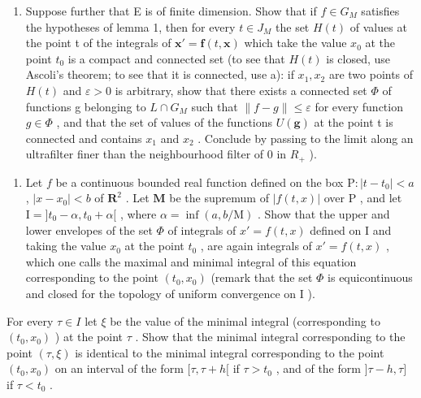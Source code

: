 \begin{enumerate}
\def\labelenumi{\alph{enumi})}
\setcounter{enumi}{1}
\tightlist
\item
  Suppose further that E is of finite dimension. Show that if \(f \in G_{M}\) satisfies the hypotheses of lemma 1, then for every \(t \in J_{M}\) the set \(H(t)\) of values at the point t of the integrals of \(\mathbf{x}' = \mathbf{f}(t, \mathbf{x})\) which take the value \(x_{0}\) at the point \(t_{0}\) is a compact and connected set (to see that \(H(t)\) is closed, use Ascoli's theorem; to see that it is connected, use a): if \(x_{1}, x_{2}\) are two points of \(H(t)\) and \(\varepsilon > 0\) is arbitrary, show that there exists a connected set \(\Phi\) of functions g belonging to \(L \cap G_{M}\) such that \(\|f - g\| \leqslant \varepsilon\) for every function \(g \in \Phi\) , and that the set of values of the functions \(U(\mathbf{g})\) at the point t is connected and contains \(x_{1}\) and \(x_{2}\) . Conclude by passing to the limit along an ultrafilter finer than the neighbourhood filter of 0 in \(R_{+}\) ).
\end{enumerate}

\begin{enumerate}
\def\labelenumi{\arabic{enumi})}
\setcounter{enumi}{9}
\tightlist
\item
  Let \(f\) be a continuous bounded real function defined on the box \(\mathrm{P}: |t - t_0| < a\) , \(|x - x_0| < b\) of \(\mathbf{R}^2\) . Let \(\mathbf{M}\) be the supremum of \(|f(t,x)|\) over \(\mathrm{P}\) , and let \(\mathrm{I} = ]t_0 - \alpha, t_0 + \alpha[\) , where \(\alpha = \inf(a, b/\mathrm{M})\) . Show that the upper and lower envelopes of the set \(\Phi\) of integrals of \(x' = f(t,x)\) defined on \(\mathrm{I}\) and taking the value \(x_0\) at the point \(t_0\) , are again integrals of \(x' = f(t,x)\) , which one calls the maximal and minimal integral of this equation corresponding to the point \((t_0, x_0)\) (remark that the set \(\Phi\) is equicontinuous and closed for the topology of uniform convergence on \(\mathrm{I}\) ).
\end{enumerate}

For every \(\tau \in I\) let \(\xi\) be the value of the minimal integral (corresponding to \((t_0, x_0)\) ) at the point \(\tau\) . Show that the minimal integral corresponding to the point \((\tau, \xi)\) is identical to the minimal integral corresponding to the point \((t_0, x_0)\) on an interval of the form \([\tau, \tau + h[\) if \(\tau > t_0\) , and of the form \(]\tau - h, \tau]\) if \(\tau < t_0\) .

